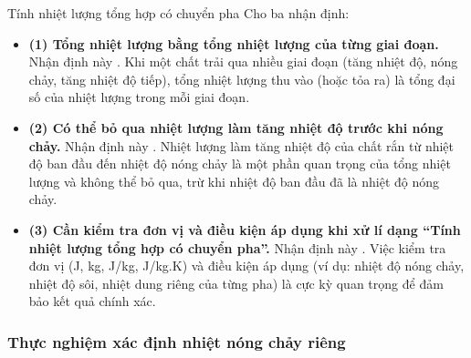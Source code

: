 \begin{hoatdong}{Tính nhiệt lượng tổng hợp có chuyển pha}
Cho ba nhận định:
\begin{itemize}
    \item \textbf{(1) Tổng nhiệt lượng bằng tổng nhiệt lượng của từng giai đoạn.}
    Nhận định này . Khi một chất trải qua nhiều giai đoạn (tăng nhiệt độ, nóng chảy, tăng nhiệt độ tiếp), tổng nhiệt lượng thu vào (hoặc tỏa ra) là tổng đại số của nhiệt lượng trong mỗi giai đoạn.
    \item \textbf{(2) Có thể bỏ qua nhiệt lượng làm tăng nhiệt độ trước khi nóng chảy.}
    Nhận định này . Nhiệt lượng làm tăng nhiệt độ của chất rắn từ nhiệt độ ban đầu đến nhiệt độ nóng chảy là một phần quan trọng của tổng nhiệt lượng và không thể bỏ qua, trừ khi nhiệt độ ban đầu đã là nhiệt độ nóng chảy.
    \item \textbf{(3) Cần kiểm tra đơn vị và điều kiện áp dụng khi xử lí dạng “Tính nhiệt lượng tổng hợp có chuyển pha”.}
    Nhận định này . Việc kiểm tra đơn vị (J, kg, J/kg, J/kg.K) và điều kiện áp dụng (ví dụ: nhiệt độ nóng chảy, nhiệt độ sôi, nhiệt dung riêng của từng pha) là cực kỳ quan trọng để đảm bảo kết quả chính xác.
\end{itemize}
\end{hoatdong}

\subsubsection{Thực nghiệm xác định nhiệt nóng chảy riêng}

